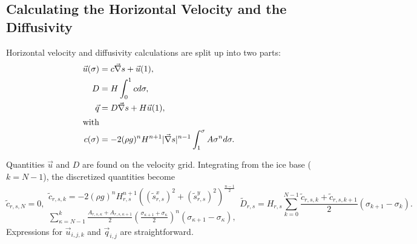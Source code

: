 \subsection{Calculating the Horizontal Velocity and the Diffusivity}
Horizontal velocity and diffusivity calculations are split up into two parts:
\begin{subequations}
  \label{kin.eq.horiz_diffusivity}
  \begin{align}
    \vec u(\sigma)&=c\vec\nabla s+\vec u(1),\\
    D &=H\int_0^1cd\sigma,\\
    \vec q&=D\vec\nabla s+H\vec u(1),\\
    \intertext{with}
    c(\sigma)&=-2(\rho g)^nH^{n+1}|\vec\nabla s|^{n-1}\int_1^\sigma A\sigma^nd\sigma.
  \end{align}
\end{subequations}

Quantities $\vec u$ and $D$ are found on the velocity grid. Integrating from the ice base ($k=N-1$), the discretized quantities become
\begin{subequations}
  \begin{equation}
    \tilde{c}_{r,s,N}=0,
  \end{equation}
  \begin{multline}
    \tilde{c}_{r,s,k}=-2(\rho g)^nH_{r,s}^{n+1}\left(({\tilde{s}^x_{r,s}})^2+({\tilde{s}^y_{r,s}})^2\right)^{\frac{n-1}{2}}\\
    \sum_{\kappa=N-1}^k\frac{A_{r,s,\kappa}+A_{r,s,\kappa+1}}2 \left(\frac{\sigma_{\kappa+1}+\sigma_\kappa}2\right)^n(\sigma_{\kappa+1}-\sigma_\kappa),
  \end{multline}
  \begin{equation}
    \tilde{D}_{r,s}=H_{r,s}\sum_{k=0}^{N-1}\frac{\tilde{c}_{r,s,k}+\tilde{c}_{r,s,k+1}}2(\sigma_{k+1}-\sigma_k).
  \end{equation}
\end{subequations}
Expressions for $\vec{u}_{i,j,k}$ and $\vec{q}_{i,j}$ are straightforward.

